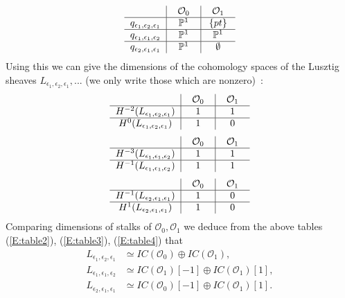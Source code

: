 \documentclass[a4paper,10pt]{amsart}
\numberwithin{equation}{section}
\begin{document}
\begin{equation}\label{E:table}
\begin{tabular}{c|c|c}
 & $\;\;\mathcal{O}_0\;\;$ & $\;\;\mathcal{O}_1\;\;$\\
\hline
$q_{\epsilon_1, \epsilon_2,\epsilon_1}$ & $\mathbb{P}^1$ &  $\{pt\}$\\
\hline
$q_{\epsilon_1, \epsilon_1,\epsilon_2}$ & $\mathbb{P}^1$ &  $\mathbb{P}^1$\\
\hline
$q_{\epsilon_2, \epsilon_1,\epsilon_1}$ & $\mathbb{P}^1$ &  $\emptyset$
\end{tabular} 
\end{equation}
Using this we can give the dimensions of the cohomology spaces of the Lusztig sheaves $L_{\epsilon_1, \epsilon_2, \epsilon_1}, ...$ (we only write those which are nonzero)~:
\begin{equation}\label{E:table2}
\begin{tabular}{c|c|c}
 & $\;\;\mathcal{O}_0\;\;$ & $\;\;\mathcal{O}_1\;\;$\\
\hline
$H^{-2}(L_{\epsilon_1, \epsilon_2,\epsilon_1})$ & $1$ &  $1$\\
\hline
$H^{0}(L_{\epsilon_1, \epsilon_2,\epsilon_1})$ & $1$ &  $0$
\end{tabular} 
\end{equation}
\begin{equation}\label{E:table3}
\begin{tabular}{c|c|c}
 & $\;\;\mathcal{O}_0\;\;$ & $\;\;\mathcal{O}_1\;\;$\\
\hline
$H^{-3}(L_{\epsilon_1, \epsilon_1,\epsilon_2})$ & $1$ &  $1$\\
\hline
$H^{-1}(L_{\epsilon_1, \epsilon_1,\epsilon_2})$ & $1$ &  $1$
\end{tabular} 
\end{equation}
\begin{equation}\label{E:table4}
\begin{tabular}{c|c|c}
 & $\;\;\mathcal{O}_0\;\;$ & $\;\;\mathcal{O}_1\;\;$\\
\hline
$H^{-1}(L_{\epsilon_2, \epsilon_1,\epsilon_1})$ & $1$ &  $0$\\
\hline
$H^{1}(L_{\epsilon_2, \epsilon_1,\epsilon_1})$ & $1$ &  $0$
\end{tabular} 
\end{equation}
Comparing dimensions of stalks of $\mathcal{O}_0, \mathcal{O}_1$ we deduce from the above tables (\ref{E:table2}), (\ref{E:table3}), (\ref{E:table4}) that
\begin{equation}
\begin{split}
L_{\epsilon_1, \epsilon_2, \epsilon_1} &\simeq IC(\mathcal{O}_0) \oplus IC(\mathcal{O}_1), \\
L_{\epsilon_1, \epsilon_1, \epsilon_2} &\simeq IC(\mathcal{O}_1)[-1] \oplus IC(\mathcal{O}_1)[1], \\
L_{\epsilon_2, \epsilon_1, \epsilon_1} &\simeq IC(\mathcal{O}_0)[-1] \oplus IC(\mathcal{O}_1)[1].
\end{split}
\end{equation} 
\end{document}
